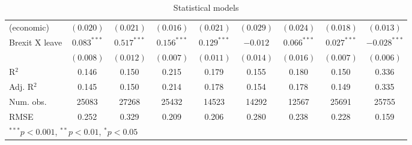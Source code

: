\documentclass{article}
\begin{document}
\begin{table}
\begin{center}
{\begin{tabular}{l c c c c c c c c }
    (economic)                             & $(0.020)$      & $(0.021)$      & $(0.016)$      & $(0.021)$      & $(0.029)$      & $(0.024)$      & $(0.018)$      & $(0.013)$      \\
Brexit X leave                   & $0.083^{***}$  & $0.517^{***}$  & $0.156^{***}$  & $0.129^{***}$  & $-0.012$       & $0.066^{***}$  & $0.027^{***}$  & $-0.028^{***}$ \\
                                 & $(0.008)$      & $(0.012)$      & $(0.007)$      & $(0.011)$      & $(0.014)$      & $(0.016)$      & $(0.007)$      & $(0.006)$      \\
\hline
R$^2$                            & 0.146          & 0.150          & 0.215          & 0.179          & 0.155          & 0.180          & 0.150          & 0.336          \\
Adj. R$^2$                       & 0.145          & 0.150          & 0.214          & 0.178          & 0.154          & 0.178          & 0.149          & 0.335          \\
Num. obs.                        & 25083          & 27268          & 25432          & 14523          & 14292          & 12567          & 25691          & 25755          \\
RMSE                             & 0.252          & 0.329          & 0.209          & 0.206          & 0.280          & 0.238          & 0.228          & 0.159          \\
\hline
\multicolumn{9}{l}{\scriptsize{$^{***}p<0.001$, $^{**}p<0.01$, $^*p<0.05$}}
\end{tabular}}
\caption{Statistical models}
\label{table:coefficients}
\end{center}
\end{table}

\end{document}
